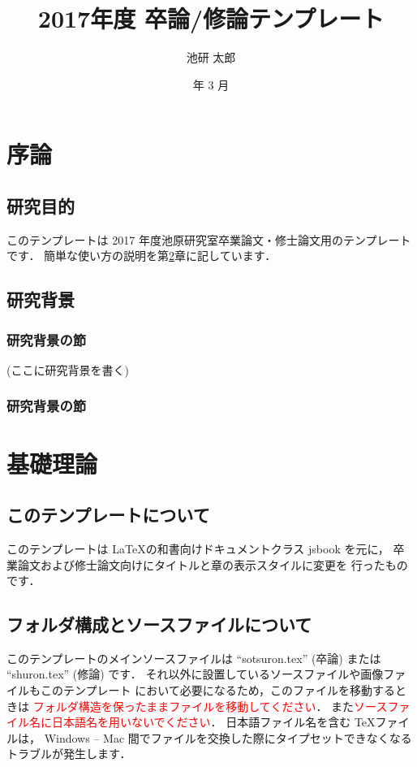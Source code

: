 \documentclass[dvipdfmx,report,disablejfam,nosetpagesize,12pt]{jsbook}
\title{2017年度 卒論/修論テンプレート}
\author{池研 太郎}
\date{\number\year 年 3 月}
\begin{document}
\frontmatter

\maketitleforcover

\maketitle

\tableofcontents

\mainmatter

\chapter{序論}
\section{研究目的}
このテンプレートは 2017 年度池原研究室卒業論文・修士論文用のテンプレートです．
簡単な使い方の説明を第\ref{Chap.basis}章に記しています．

\section{研究背景}
\subsection{研究背景の節}
(ここに研究背景を書く)
\subsection{研究背景の節}

\chapter{基礎理論} \label{Chap.basis}
\section{このテンプレートについて} \label{Sec.basis}
このテンプレートは \LaTeX の和書向けドキュメントクラス jsbook を元に，
卒業論文および修士論文向けにタイトルと章の表示スタイルに変更を
行ったものです．

\section{フォルダ構成とソースファイルについて}
このテンプレートのメインソースファイルは
``sotsuron.tex'' (卒論) または ``shuron.tex'' (修論) です．
それ以外に設置しているソースファイルや画像ファイルもこのテンプレート
において必要になるため，このファイルを移動するときは
\textcolor{red}{フォルダ構造を保ったままファイルを移動してください}．
また\textcolor{red}{ソースファイル名に日本語名を用いないでください}．
日本語ファイル名を含む \TeX ファイルは，
Windows -- Mac 間でファイルを交換した際にタイプセットできなくなる
トラブルが発生します．
\end{document}
